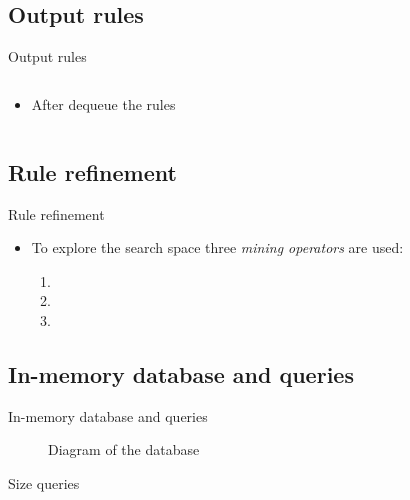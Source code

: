 \documentclass[xcolor={x11names}]{beamer}
\begin{document}
\subsection{Output rules}
\begin{frame}{Output rules}
\begin{columns}
\begin{column}{0.5\textwidth}
	\begin{itemize}
        \item After dequeue the rules
	\end{itemize}
\end{column}

\begin{column}{0.5\textwidth}
    \resizebox{0.999\textwidth}{!}{%
        
    }
\end{column}
\end{columns}
\end{frame}

\subsection{Rule refinement}
\begin{frame}{Rule refinement}
    \begin{itemize}
        \item To explore the search space three \textit{mining operators} are used:
        \begin{enumerate}
            \item 
            \item 
            \item 
        \end{enumerate}
    \end{itemize}
\end{frame}

\subsection{In-memory database and queries}
\begin{frame}{In-memory database and queries}
\begin{figure}
    
\caption{Diagram of the database}
\label{fig:db}
\end{figure}
\end{frame}

\begin{frame}{Size queries}
\end{frame}
\end{document}

